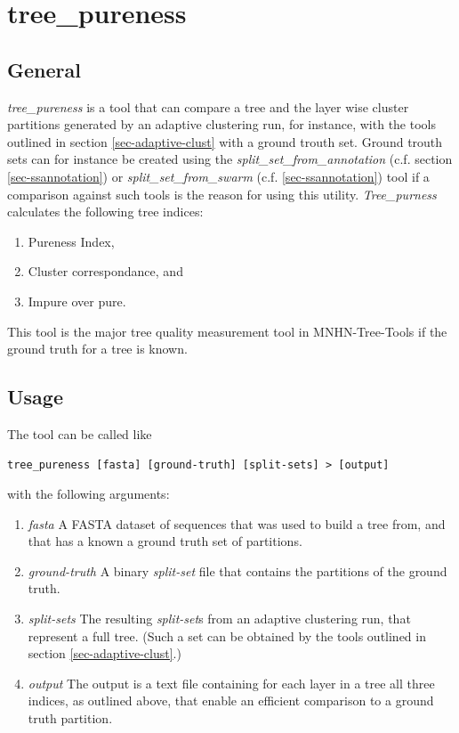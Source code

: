 \section{tree\_pureness} \label{sec-pureness}

\subsection{General}

\emph{tree\_pureness} is a tool that can compare a tree and the layer wise
cluster partitions generated by an adaptive clustering run, for
instance, with the tools outlined in section \ref{sec-adaptive-clust}
with a ground trouth set.
Ground trouth sets can for instance be created using the
\newline \emph{split\_set\_from\_annotation} (c.f. section
\ref{sec-ssannotation}) or \newline \emph{split\_set\_from\_swarm}
(c.f. \ref{sec-ssannotation})
tool if a comparison against such tools is the reason for using this
utility. \emph{Tree\_purness} calculates the following tree indices:
\begin{enumerate}
\item Pureness Index,
\item Cluster correspondance,
  and
\item Impure over pure.
\end{enumerate}
This tool is the major tree quality measurement tool in
MNHN-Tree-Tools if the ground truth for a tree is known. 

\subsection{Usage}
The tool can be called like
\begin{lstlisting}
tree_pureness [fasta] [ground-truth] [split-sets] > [output]
\end{lstlisting}
with the following arguments:
\begin{enumerate}
\item \emph{fasta} A FASTA dataset of sequences that was used to build
  a tree from, and that has a known a ground truth set of partitions.
\item \emph{ground-truth} A binary \emph{split-set} file that contains
  the partitions of the ground truth.
\item \emph{split-sets} The resulting \emph{split-set}s from an adaptive
  clustering run, that represent a full tree. (Such a set can be
  obtained by the tools outlined in section \ref{sec-adaptive-clust}.)
\item \emph{output} The output is a text file containing for each layer in a
  tree all three indices, as outlined above, that enable an efficient
  comparison to a ground truth partition.
\end{enumerate}

